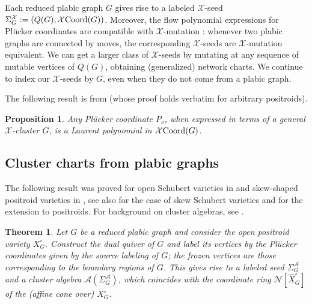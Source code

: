 \documentclass{amsart}
\newtheorem{theorem}[thm]{Theorem}
\newtheorem{proposition}[thm]{Proposition}
\theoremstyle{definition}
\numberwithin{equation}{section}
\newcommand{\CC}{\mathcal{N}}
\newcommand{\TBG}{{\mathcal X\hskip -.05cm\operatorname{Coord}(G)}}
\newcommand{\TB}{{\mathcal X\hskip -.05cm\operatorname{Coord}}}
\begin{document}
Each reduced plabic graph $G$ gives rise to a 
labeled $\mathcal{X}$-seed 
$\Sigma_G^{\mathcal{X}}:=(Q(G), 
{\TB}(G))$. Moreover, the flow polynomial expressions for 
Pl\"ucker coordinates are 
compatible with  $\mathcal{X}$-mutation 
\cite[Lemma 6.15]{RW}: 
whenever two 
plabic graphs are connected by moves, 
the corresponding
$\mathcal{X}$-seeds are $\mathcal{X}$-mutation equivalent.
We can get a larger class of $\mathcal{X}$-seeds by 
mutating at any sequence of mutable vertices of $Q(G)$, obtaining
(generalized) network charts.  We continue to index our 
$\mathcal{X}$-seeds by $G$, even when 
they do not come from a plabic graph.


The following result is from
\cite[Proposition 7.6]{RW} (whose proof holds verbatim for
arbitrary positroids). 
\begin{proposition}\label{thm:Laurent}
Any Pl\"ucker coordinate $P_{\nu}$, when expressed in terms of
a general $\mathcal{X}$-cluster $G$,
is a Laurent polynomial in $\TBG$.
\end{proposition}

\subsection{Cluster charts
from plabic graphs}\label{sec:cluster}

The following result was proved for open Schubert varieties in \cite{SSW}
and skew-shaped positroid varieties in \cite{GKSS}, see also 
\cite{SSW} for the case of skew Schubert varieties and \cite{GalashinLam} for the 
extension to positroids.
For background on cluster algebras, see \cite{ca1, FWZ1, FWZ2}.

\begin{theorem}\label{thm:cluster}
Let $G$ be a reduced plabic graph and
consider the open positroid variety
 $X_{G}^\circ$.
Construct the dual quiver of $G$ and
label its vertices by the Pl\"ucker coordinates
given by the source labeling of $G$; the frozen
vertices are those corresponding to the boundary regions of $G$.
This gives rise to a labeled seed
$\Sigma_G^{\mathcal{A}}$ and a
cluster algebra
$\mathcal{A}
        (\Sigma^{\mathcal{A}}_G)$, which coincides with
 the coordinate ring
        $\CC[\widehat{X}_{G}^\circ]$
of the (affine cone over) $X_{G}^\circ$.
\end{theorem}
\end{document}
